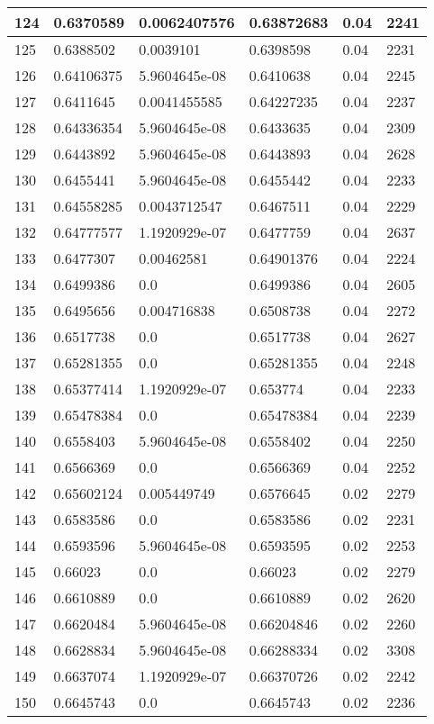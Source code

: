 \begin{longtable}{|l|l|l|l|l|l|}
124 & 0.6370589 & 0.0062407576 & 0.63872683 & 0.04 & 2241 \\ \hline 
125 & 0.6388502 & 0.0039101 & 0.6398598 & 0.04 & 2231 \\ \hline 
126 & 0.64106375 & 5.9604645e-08 & 0.6410638 & 0.04 & 2245 \\ \hline 
127 & 0.6411645 & 0.0041455585 & 0.64227235 & 0.04 & 2237 \\ \hline 
128 & 0.64336354 & 5.9604645e-08 & 0.6433635 & 0.04 & 2309 \\ \hline 
129 & 0.6443892 & 5.9604645e-08 & 0.6443893 & 0.04 & 2628 \\ \hline 
130 & 0.6455441 & 5.9604645e-08 & 0.6455442 & 0.04 & 2233 \\ \hline 
131 & 0.64558285 & 0.0043712547 & 0.6467511 & 0.04 & 2229 \\ \hline 
132 & 0.64777577 & 1.1920929e-07 & 0.6477759 & 0.04 & 2637 \\ \hline 
133 & 0.6477307 & 0.00462581 & 0.64901376 & 0.04 & 2224 \\ \hline 
134 & 0.6499386 & 0.0 & 0.6499386 & 0.04 & 2605 \\ \hline 
135 & 0.6495656 & 0.004716838 & 0.6508738 & 0.04 & 2272 \\ \hline 
136 & 0.6517738 & 0.0 & 0.6517738 & 0.04 & 2627 \\ \hline 
137 & 0.65281355 & 0.0 & 0.65281355 & 0.04 & 2248 \\ \hline 
138 & 0.65377414 & 1.1920929e-07 & 0.653774 & 0.04 & 2233 \\ \hline 
139 & 0.65478384 & 0.0 & 0.65478384 & 0.04 & 2239 \\ \hline 
140 & 0.6558403 & 5.9604645e-08 & 0.6558402 & 0.04 & 2250 \\ \hline 
141 & 0.6566369 & 0.0 & 0.6566369 & 0.04 & 2252 \\ \hline 
142 & 0.65602124 & 0.005449749 & 0.6576645 & 0.02 & 2279 \\ \hline 
143 & 0.6583586 & 0.0 & 0.6583586 & 0.02 & 2231 \\ \hline 
144 & 0.6593596 & 5.9604645e-08 & 0.6593595 & 0.02 & 2253 \\ \hline 
145 & 0.66023 & 0.0 & 0.66023 & 0.02 & 2279 \\ \hline 
146 & 0.6610889 & 0.0 & 0.6610889 & 0.02 & 2620 \\ \hline 
147 & 0.6620484 & 5.9604645e-08 & 0.66204846 & 0.02 & 2260 \\ \hline 
148 & 0.6628834 & 5.9604645e-08 & 0.66288334 & 0.02 & 3308 \\ \hline 
149 & 0.6637074 & 1.1920929e-07 & 0.66370726 & 0.02 & 2242 \\ \hline 
150 & 0.6645743 & 0.0 & 0.6645743 & 0.02 & 2236 \\ \hline 
\end{longtable}